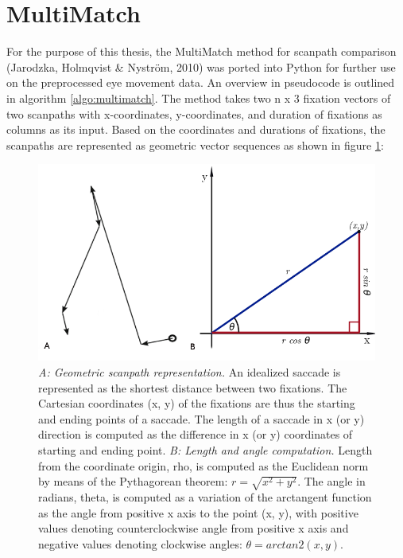 \documentclass[a4paper, 12pt]{scrreprt}
\begin{document}
\section{MultiMatch}
For the purpose of this thesis, the MultiMatch method for scanpath comparison (Jarodzka, Holmqvist \& Nyström, 2010) was ported into Python for further use on the preprocessed eye movement data. An overview in pseudocode is outlined in algorithm \ref{algo:multimatch}. \newline 
The method takes two n x 3 fixation vectors of two scanpaths with x-coordinates, y-coordinates, and duration of fixations as columns as its input. Based on the coordinates and durations of fixations, the scanpaths are represented as geometric vector sequences as shown in figure \ref{fig:Polar_to_cartesian}:

\begin{figure}[H]
		\includegraphics[scale=0.35]{img/scanpathconversion.png}
		\caption[Geometric representation of eye movements]
		{\small{\textit{A: Geometric scanpath representation.} An idealized saccade is represented as the shortest distance between two fixations. The Cartesian coordinates (x, y) of the fixations are thus the starting and ending points of a saccade. The length of a saccade in x (or y) direction is computed as the difference in x (or y) coordinates of starting and ending point. \newline
		\textit{B: Length and angle computation.} Length from the coordinate origin, rho, is computed as the Euclidean norm by means of the Pythagorean theorem: $r = \sqrt{ x^2 + y^2}$. The angle in radians, theta, is computed as a variation of the arctangent function as the angle from positive x axis to the point (x, y), with positive values denoting counterclockwise angle from positive x axis and negative values denoting clockwise angles: $\theta = arctan2(x, y)$.}}
		\label{fig:Polar_to_cartesian}
\end{figure}
\end{document}
